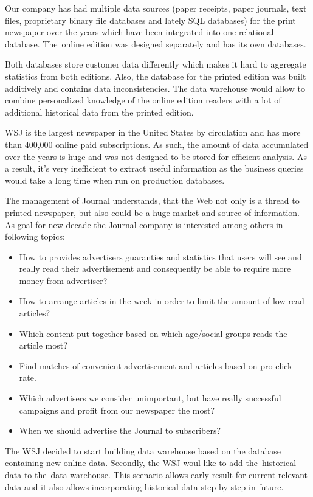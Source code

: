  
Our company has had multiple data sources (paper receipts, paper journals, text files, proprietary binary file databases and lately SQL databases) for the print newspaper over the years which have been integrated into one relational database. 
The~online edition was designed separately and has its own databases. 

Both databases store customer data differently which makes it hard to aggregate statistics from both editions. Also, the database for the printed edition was built additively and contains data inconsistencies. The data warehouse would allow to combine personalized knowledge of the online edition readers with a lot of additional historical data from the printed edition.


WSJ is the largest newspaper in the United States by circulation and has more than 400,000 online paid subscriptions. As such, the amount of data accumulated over the years is huge and was not designed to be stored for efficient analysis. As a result, it's very inefficient to extract useful information as the business queries would take a long time when run on production databases.

The management of Journal understands, that the Web not only is a thread to printed newspaper, but also could be a huge market and source of information. As goal for new decade the Journal company is interested among others in following topics:
\begin{itemize}
    \item How to provides advertisers guaranties and statistics that users will see and really read their advertisement and consequently be able to require more money from advertiser?
    \item How to arrange articles in the week in order to limit the amount of low read articles?
    \item Which content put together based on which age/social groups reads the article most?
    \item Find matches of convenient advertisement and articles based on pro click rate.
    \item Which advertisers we consider unimportant, but have really successful campaigns and profit from our newspaper the most?
    \item When we should advertise the Journal to subscribers?
\end{itemize}

The WSJ decided to start building data warehouse based on the database containing new online data. Secondly, the WSJ woul like to add the~historical data to the~data warehouse. This scenario allows early result for current relevant data and it also allows incorporating historical data step by step in future.

